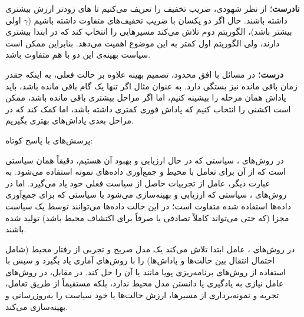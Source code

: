 \begin{ابجد}
\item \textbf{نادرست}؛ از نظر شهودی، ضریب تخفیف را تعریف می‌کنیم تا  های زودتر ارزش بیشتری داشته باشند. حال اگر دو  یکسان با ضریب تخفیف‌های متفاوت داشته باشیم ($\gamma$ اولی بیشتر باشد)، الگوریتم دوم تلاش می‌کند مسیرهایی را انتخاب کند که در ابتدا  بیشتری دارند، ولی الگوریتم اول کمتر به این موضوع اهمیت می‌دهد. بنابراین ممکن است سیاست بهینه‌ی این دو با هم متفاوت باشد.

\item \textbf{درست}؛ در مسائل با افق محدود، تصمیم بهینه علاوه بر حالت فعلی، به اینکه چقدر زمان باقی مانده نیز بستگی دارد. به عنوان مثال اگر تنها یک گام باقی مانده باشد، باید پاداش همان مرحله را بیشینه کنیم، اما اگر مراحل بیشتری باقی مانده باشد، ممکن است اکشنی را انتخاب کنیم که پاداش فوری کمتری داشته باشد، اما کمک کند که در مراحل بعدی پاداش‌های بهتری بگیریم.

\end{ابجد}

پرسش‌های با پاسخ کوتاه:

\begin{ابجد}
\item در روش‌های ، سیاستی که در حال ارزیابی و بهبود آن هستیم، دقیقاً همان سیاستی است که از آن برای تعامل با محیط و جمع‌آوری داده‌های نمونه استفاده می‌شود. به عبارت دیگر، عامل از تجربیات حاصل از سیاست فعلی خود یاد می‌گیرد. اما در روش‌های ، سیاستی که ارزیابی و بهینه‌سازی می‌شود با سیاستی که برای جمع‌آوری داده‌ها استفاده شده متفاوت است؛ در این حالت داده‌ها می‌توانند توسط یک سیاست مجزا (که حتی می‌تواند کاملاً تصادفی یا صرفاً برای اکتشاف محیط باشد) تولید شده باشند.

\item در روش‌های ، عامل ابتدا تلاش می‌کند یک مدل صریح و تجربی از رفتار محیط (شامل احتمال انتقال بین حالت‌ها و پاداش‌ها) را با روش‌های آماری یاد بگیرد و سپس با استفاده از روش‌های برنامه‌ریزی پویا مانند  یا  آن را حل کند. در مقابل، در روش‌های  عامل نیازی به یادگیری یا دانستن مدل محیط ندارد، بلکه مستقیماً از طریق تعامل، تجربه و نمونه‌برداری از مسیرها، ارزش حالت‌ها یا خود سیاست را به‌روزرسانی و بهینه‌سازی می‌کند.

\end{ابجد}